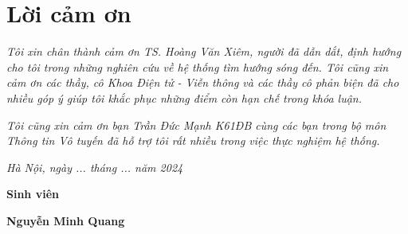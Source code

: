 \clearpage
{}

\chapter*{Lời cảm ơn}

\textit{Tôi xin chân thành cảm ơn TS. Hoàng Văn Xiêm, người đã dẫn dắt, định hướng cho tôi trong những nghiên cứu về hệ thống tìm hướng sóng đến. Tôi cũng xin cảm ơn các thầy, cô Khoa Điện tử - Viễn thông và các thầy cô phản biện đã cho nhiều góp ý giúp tôi khắc phục những điểm còn hạn chế trong khóa luận.}

\textit{Tôi cũng xin cảm ơn bạn Trần Đức Mạnh K61ĐB cùng các bạn trong bộ môn Thông tin Vô tuyến đã hỗ trợ tôi rất nhiều trong việc thực nghiệm hệ thống.}

\vspace{1cm}
\hspace{7cm}\textit{Hà Nội, ngày ... tháng ... năm 2024}

\hspace{9.4cm}\textbf{Sinh viên}
\vspace{2.5cm}


\hspace{9.3cm}\textbf{Nguyễn Minh Quang}

